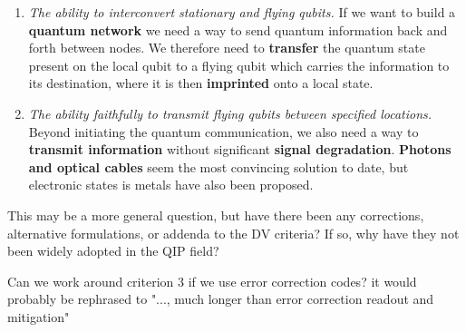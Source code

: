 \documentclass{alex_summary}
\begin{document}
\begin{enumerate}[leftmargin=*]
	\item \textit{The ability to interconvert stationary and flying qubits.} If we want to build a \textbf{quantum network} we need a way to send quantum information back and forth between nodes. We therefore need to \textbf{transfer} the quantum state present on the local qubit to a flying qubit which carries the information to its destination, where it is then \textbf{imprinted} onto a local state. 	
	\item \textit{The ability faithfully to transmit flying qubits between specified locations.} Beyond initiating the quantum communication, we also need a way to \textbf{transmit information} without significant \textbf{signal degradation}. \textbf{Photons and optical cables} seem the most convincing solution to date, but electronic states is metals have also been proposed.\\
\end{enumerate}

\begin{question1}
	This may be a more general question, but have there been any corrections, alternative formulations, or addenda to the DV criteria? If so, why have they not been widely adopted in the QIP field?
\end{question1}

\begin{question3}
	Can we work around criterion 3 if we use error correction codes? it would probably be rephrased to "..., much longer than error correction readout and mitigation"
\end{question3}

\printbibliography
\end{document}
